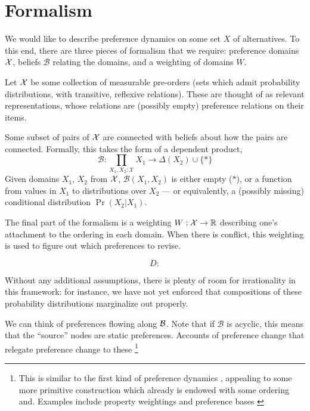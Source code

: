 \documentclass{book}
\begin{document}
	\section{Formalism}
	
	
	We would like to describe preference dynamics on some set $X$ of alternatives. To this end, there are three pieces of formalism that we require: preference domains $\cal X$, beliefs $\mathcal B$ relating the domains, and a weighting of domains $W$.
	
	Let $\cal X$ be some collection of measurable pre-orders (sets which admit probability distributions, with transitive, reflexive relations). These are thought of as relevant representations, whose relations are (possibly empty) preference relations on their items. 
	
	Some subset of pairs of $\cal X$ are connected with beliefs about how the pairs are connected. Formally, this takes the form of a dependent product, 
	\[ \mathcal B : \prod_{X_1, X_2 : \mathcal X}  X_1 \to \Delta(X_2) \cup \{ \ast \}  \]
	Given domains $X_1$, $X_2$ from $\cal X$, $\mathcal B(X_1,X_2)$ is either empty ($\ast$), or a function from values in $X_1$ to distributions over $X_2$ --- or equivalently, a (possibly missing) conditional distribution $\Pr(X_2 | X_1)$.

	The final part of the formalism is a weighting $W : \cal X \to \mathbb{R}$ describing one's attachment to the ordering in each domain. When there is conflict, this weighting is used to figure out which preferences to revise.
	
	\[ D :  \]

	
	Without any additional assumptions, there is plenty of room for irrationality in this framework: for instance, we have not yet enforced that compositions of these probability distributions marginalize out properly.
	
	
	
	We can think of preferences flowing along $\cal B$. Note that if $\mathcal B$ is acyclic, this means that the ``source'' nodes are static preferences. Accounts of preference change that relegate preference change to these \footnote{This is similar to the first kind of preference dynamics \cite{grune2009preference}, appealing to some more primitive construction which already is endowed with some ordering and. Examples include property weightings \cite{dietrich2013preferences} and preference bases \cite{girard2008modal}} 
	
\end{document}
